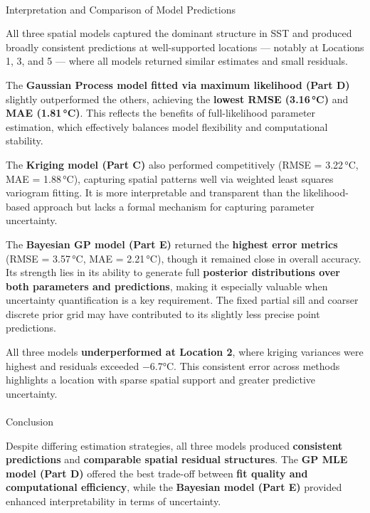 \documentclass[
  11pt,
]{article}
\makeatletter
\let\oldparagraph\paragraph
\renewcommand{\paragraph}{
    \@ifstar
      \xxxParagraphStar
      \xxxParagraphNoStar
  }
\newcommand{\xxxParagraphStar}[1]{\oldparagraph*{#1}\mbox{}}
\newcommand{\xxxParagraphNoStar}[1]{\oldparagraph{#1}\mbox{}}
\makeatother
\begin{document}
\paragraph{Interpretation and Comparison of Model
Predictions}\label{interpretation-and-comparison-of-model-predictions}

All three spatial models captured the dominant structure in SST and
produced broadly consistent predictions at well-supported locations ---
notably at Locations 1, 3, and 5 --- where all models returned similar
estimates and small residuals.

The \textbf{Gaussian Process model fitted via maximum likelihood (Part
D)} slightly outperformed the others, achieving the \textbf{lowest RMSE
(3.16\,°C)} and \textbf{MAE (1.81\,°C)}. This reflects the benefits of
full-likelihood parameter estimation, which effectively balances model
flexibility and computational stability.

The \textbf{Kriging model (Part C)} also performed competitively (RMSE =
3.22\,°C, MAE = 1.88\,°C), capturing spatial patterns well via weighted
least squares variogram fitting. It is more interpretable and
transparent than the likelihood-based approach but lacks a formal
mechanism for capturing parameter uncertainty.

The \textbf{Bayesian GP model (Part E)} returned the \textbf{highest
error metrics} (RMSE = 3.57\,°C, MAE = 2.21\,°C), though it remained
close in overall accuracy. Its strength lies in its ability to generate
full \textbf{posterior distributions over both parameters and
predictions}, making it especially valuable when uncertainty
quantification is a key requirement. The fixed partial sill and coarser
discrete prior grid may have contributed to its slightly less precise
point predictions.

All three models \textbf{underperformed at Location 2}, where kriging
variances were highest and residuals exceeded −6.7°C. This consistent
error across methods highlights a location with sparse spatial support
and greater predictive uncertainty.

\paragraph{Conclusion}\label{conclusion-1}

Despite differing estimation strategies, all three models produced
\textbf{consistent predictions} and \textbf{comparable spatial residual
structures}. The \textbf{GP MLE model (Part D)} offered the best
trade-off between \textbf{fit quality and computational efficiency},
while the \textbf{Bayesian model (Part E)} provided enhanced
interpretability in terms of uncertainty.
\end{document}
